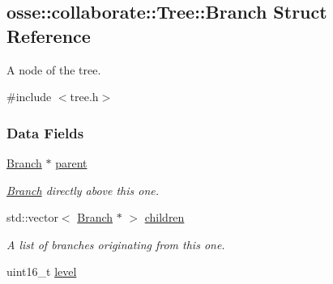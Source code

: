 \hypertarget{structosse_1_1collaborate_1_1_tree_1_1_branch}{}\subsection{osse\+:\+:collaborate\+:\+:Tree\+:\+:Branch Struct Reference}
\label{structosse_1_1collaborate_1_1_tree_1_1_branch}


A node of the tree.  




{\ttfamily \#include $<$tree.\+h$>$}

\subsubsection*{Data Fields}
\begin{DoxyCompactItemize}
\item 
\mbox{\label{structosse_1_1collaborate_1_1_tree_1_1_branch_afecb0b159e3237922a98f19fabe253d4}} 
\hyperlink{structosse_1_1collaborate_1_1_tree_1_1_branch}{Branch} $\ast$ \hyperlink{structosse_1_1collaborate_1_1_tree_1_1_branch_afecb0b159e3237922a98f19fabe253d4}{parent}
\begin{DoxyCompactList}\small\item\em \hyperlink{structosse_1_1collaborate_1_1_tree_1_1_branch}{Branch} directly above this one. \end{DoxyCompactList}\item 
\mbox{\label{structosse_1_1collaborate_1_1_tree_1_1_branch_a6a203234c56628ffa2e00c02feb56889}} 
std\+::vector$<$ \hyperlink{structosse_1_1collaborate_1_1_tree_1_1_branch}{Branch} $\ast$ $>$ \hyperlink{structosse_1_1collaborate_1_1_tree_1_1_branch_a6a203234c56628ffa2e00c02feb56889}{children}
\begin{DoxyCompactList}\small\item\em A list of branches originating from this one. \end{DoxyCompactList}\item 
\mbox{\label{structosse_1_1collaborate_1_1_tree_1_1_branch_adc93639463bcedf30093971acb1ffed7}} 
uint16\+\_\+t \hyperlink{structosse_1_1collaborate_1_1_tree_1_1_branch_adc93639463bcedf30093971acb1ffed7}{level}

\end{DoxyCompactItemize}
